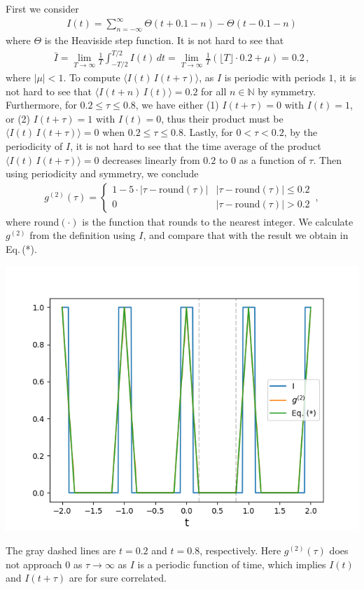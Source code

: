 \documentclass[11pt, oneside]{book}
\theoremstyle{break}
\theoremstyle{break}
\newcommand{\N}{\mathbb{N}}
\begin{document}
\chapter{}
First we consider 
\begin{align*}
I(t) = \sum_{n=-\infty}^\infty \Theta(t+0.1-n) -\Theta(t-0.1-n)
\end{align*}
where $\Theta$ is the Heaviside step function. It is not hard to see that 
\begin{align*}
\bar{I} = 
\lim_{T\to \infty}\frac{1}{T}\int_{-T/2}^{T/2}I(t) \, dt
=
\lim_{T\to \infty}\frac{1}{T} \left(\lfloor T\rfloor \cdot 0.2 + \mu\right)= 0.2\,,
\end{align*} 
where $|\mu| <1$.  To compute $\langle I(t) \, I(t+\tau)\rangle$, as $I$ is periodic with periods $1$, it is not hard to see that $\langle I(t+n)\,I(t)\rangle = 0.2$ for all $n\in \N$ by symmetry. Furthermore, for $0.2\leq \tau \leq 0.8$, we have either (1) $I(t+\tau) = 0$ with $I(t) =1$, or (2) $I(t+\tau) = 1$ with $I(t) = 0$, thus their product must be $\langle I(t) \, I(t+\tau) \rangle = 0$ when $0.2\leq \tau \leq 0.8$. Lastly, for $0< \tau < 0.2$, by the periodicity of $I$, it is not hard to see that the time average of the product $\langle I(t) \, I(t+\tau) \rangle = 0$ decreases linearly from $0.2$ to $0$ as a function of $\tau$. Then using periodicity and symmetry, we conclude 
\begin{align*}
g^{(2)}(\tau) = \begin{cases}
1- 5 \cdot |\tau -\text{round}(\tau)| & |\tau -\text{round}(\tau)| \leq 0.2 \\
0 & |\tau -\text{round}(\tau)|> 0.2
\end{cases} \,, \tag{*}
\end{align*}
where round$(\cdot)$ is the function that rounds to the nearest integer. We calculate $g^{(2)}$ from the definition using $I$, and compare that with the result we obtain in Eq.\,(*). 

\begin{center}
\includegraphics[scale=0.65]{542HW9/P3}
\end{center}
The gray dashed lines are $t = 0.2$ and $t = 0.8$, respectively. Here $g^{(2)}(\tau)$ does not approach $0$ as $\tau \to \infty$ as $I$ is a periodic function of time, which implies $I(t)$ and $I(t+\tau)$ are for sure correlated. 
 
\end{document}

